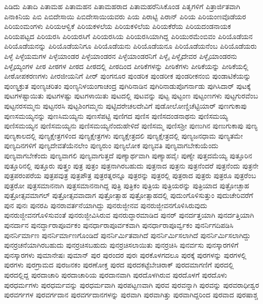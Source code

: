 {ಪಿಡಿದು
ಪಿತಾದಿ
ಪಿತಾಮಹ
ಪಿತಾಮಹನ
ಪಿತಾಮಹರಾದ
ಪಿತಾಮಹರೆನಿಸಿಕೊಂಡ
ಪಿತೃಗಳಿಗೆ
ಪಿತ್ರಾರ್ಜಿತವಾಗಿ
ಪಿನಾಕಿನಿಯ
ಪಿಬಿ
ಪಿಬಿದೇಸಾಯಿ
ಪಿಬಿದೇಸಾಯಿಯವರು
ಪಿಯ
ಪಿರಾಟ್ಟಿ
ಪಿರಾನ್
ಪಿರಿಯ
ಪಿರಿಯಂಣವೊಡೆಯರ
ಪಿರಿಯಂಮಂಗಳು
ಪಿರಿಯಆಳ್ವಿಕೆ
ಪಿರಿಯಕಳಲೆಯ
ಪಿರಿಯಕಳಿಲೆಯ
ಪಿರಿಯಕೆರೆಯ
ಪಿರಿಯದಂಡನಾಯಕ
ಪಿರಿಯಪಟ್ಟದ
ಪಿರಿಯರಸಿ
ಪಿರಿಯರಸಿಗೆ
ಪಿರಿಯರಸಿಯ
ಪಿರಿಯರಸಿಯಾಗಿದ್ದ
ಪಿರಿಯುರಮೆಂಬಿವಂ
ಪಿರಿಯೊಡೆಯನ
ಪಿರಿಯೊಡೆಯನನ್ನು
ಪಿರಿಯೊಡೆಯನಿಗೂ
ಪಿರಿಯೊಡೆಯನು
ಪಿರಿಯೊಡೆಯನೂ
ಪಿರಿಯೊಡೆಯನೆಂಬ
ಪಿರಿಯೊಡೆಯರು
ಪಿಳ್ಳೆ
ಪಿಳ್ಳೆಯಮಗಳ
ಪಿಳ್ಳೆಯಾಂಡರ
ಪಿಳ್ಳೆಯಾಂಡರನ
ಪಿಳ್ಳೆಯಾಂಡರನಿಗೆ
ಪಿಳ್ಳೈ
ಪಿಳ್ಳೈದೇವರ
ಪಿಳ್ಳೈಯಾಂಡರನು
ಪಿಳ್ಳೈಯ್ಯಂಗಳ
ಪೀಠ
ಪೀಠಗಳ
ಪೀಠದ
ಪೀಠದಲ್ಲಿ
ಪೀಠದಿಂದ
ಪೀಠಿಕೆಗಳನ್ನು
ಪೀಠಿಕೆಗಳು
ಪೀಠಿಕೆಯನ್ನು
ಪೀಠಿಕೆಯಲ್ಲಿ
ಪೀಠೋಪಕರಣಗಳು
ಪೀರಜೀಯನಿಗೆ
ಪೀರ್
ಪುಂಗನೂರ
ಪುಂಡರಿಕ
ಪುಂಡರೀಕ
ಪುಂಡರೀಕನಂಬಿ
ಪುಂಡಾಟಿಕೆಯನ್ನು
ಪುಂಣ್ಯಕ್ರುತ
ಪುಂಣ್ಯಚರಿತಂ
ಪುಂಣ್ಯನಿಳಯಂಗಾಚಂದ್ರ
ಪುಗಿರಿನಾಡಿನ
ಪುಗಿರಿನಾಡುಪೊಗರ್ನಾಡು
ಪುಗಿಸಿದಾರ್
ಪುಟಕ್ಕೆ
ಪುಟಗಳಷ್ಟಾಯಿತು
ಪುಟಗಳಷ್ಟು
ಪುಟಗಳಾಯಿತು
ಪುಟದಲ್ಲಿ
ಪುಟವನ್ನು
ಪುಟ್ಟ
ಪುಟ್ಟಂಣ
ಪುಟ್ಟಂಣಗಳು
ಪುಟ್ಟಗುರವೆಂಬ
ಪುಟ್ಟನರಸಮ್ಮನು
ಪುಟ್ಟನರಸಿ
ಪುಟ್ಟಶಿಂಗಮ್ಮನು
ಪುಟ್ಟಿದರೇಚಲದೇವಿಗೆ
ಪುಡೋಲೋಣ್ಡಿಚೆಟ್ಟಿಯಾರ್
ಪುಣಗುಕಾಪು
ಪುಣಸಮಯ್ಯನನ್ನು
ಪುಣಸಿಮಯ್ಯನು
ಪುಣಸೆಪಟ್ಟಿ
ಪುಣಿಗದ
ಪುಣಿಸ
ಪುಣಿಸದಂಡನಾಥನು
ಪುಣಿಸಮಯ್ಯ
ಪುಣಿಸಮಯ್ಯನ
ಪುಣಿಸಮಯ್ಯನು
ಪುಣಿಸಮಯ್ಯನೆಂದುಹೇಳಿದೆ
ಪುಣಿಸಮ್ಮ
ಪುಣಿಸಶ್ರೀ
ಪುಣುಗಿನ
ಪುಣುಗುಕಾಪು
ಪುಣ್ಯ
ಪುಣ್ಯಕಾಲದಲ್ಲಿ
ಪುಣ್ಯಕ್ಷೇತ್ರಗಳಿಂದ
ಪುಣ್ಯಕ್ಷೇತ್ರಗಳು
ಪುಣ್ಯಕ್ಷೇತ್ರದಲಿ
ಪುಣ್ಯಕ್ಷೇತ್ರದಲ್ಲಿ
ಪುಣ್ಯಜನಧಾಮ
ಪುಣ್ಯತಮೇ
ಪುಣ್ಯದಿನಗಳಿಗೆ
ಪುಣ್ಯದೇವತೆಯೆನಲೇಂ
ಪುಣ್ಯರುಂ
ಪುಣ್ಯಲೋಕ
ಪುಣ್ಯವತಿ
ಪುಣ್ಯವಾಗಬೇಕುಯೆಂದು
ಪುಣ್ಯವಾಗಬೇಕೆಂದು
ಪುಣ್ಯವಾಗಲಿ
ಪುಣ್ಯವಾಗುತ್ತದೆ
ಪುಣ್ಯಾರ್ಥವಾಗಿ
ಪುಣ್ಯಾಹವೈಃ
ಪುಣ್ಯೇ
ಪುತ್ತದಮೆಯ್ಯ
ಪುತ್ತೂರಿನ
ಪುತ್ತೂರಿನಲ್ಲಿ
ಪುತ್ತೂರು
ಪುತ್ತ್ರಂ
ಪುತ್ರ
ಪುತ್ರಂ
ಪುತ್ರನಾಗಿರಬಹುದು
ಪುತ್ರನಾದ
ಪುತ್ರನು
ಪುತ್ರನೆಂದರೆ
ಪುತ್ರನೆಂದು
ಪುತ್ರನೇ
ಪುತ್ರಪರಂಪರೆಯ
ಪುತ್ರಪವುತ್ರ
ಪುತ್ರಪೌತ್ರ
ಪುತ್ರರತ್ನರನ್ನೂ
ಪುತ್ರರನ್ನು
ಪುತ್ರರಲ್ಲಿ
ಪುತ್ರರಾದ
ಪುತ್ರರು
ಪುತ್ರರೂ
ಪುತ್ರರೆಂಬ
ಪುತ್ರರೋ
ಪುತ್ರಸಮಾನನಾಗಿ
ಪುತ್ರಸಮಾನನಾಗಿದ್ದ
ಪುತ್ರಿ
ಪುತ್ರಿಕಂ
ಪುತ್ರಿಯ
ಪುತ್ರಿಯರನ್ನು
ಪುತ್ರಿಯಾದ
ಪುತ್ರೋಚ್ಛಾಹ
ಪುತ್ರೋತ್ಸವಮಾಗಲ್
ಪುತ್ರೋತ್ಸವವಾದಾಗ
ಪುತ್ರೋತ್ಸಾಹ
ಪುತ್ರೋತ್ಸಾಹದಲ್ಲಿ
ಪುದುಂಗೊಳಿಸುತ್ತುಂ
ಪುದುಚೇರಿವರೆಗೆ
ಪುನ
ಪುನಃ
ಪುನರಪಿ
ಪುನರಾವರ್ತನೆಯಾಗಿದ್ದು
ಪುನರುಜ್ಜೀನವ
ಪುನರುಜ್ಜೀವನಗೊಳಿಸಿರುವುದು
ಪುನರುಜ್ಜೀವನಗೊಳಿಸುವಂತೆ
ಪುನರುಜ್ಜೀವಿಸಿರುವ
ಪುನರುದ್ಧಾರಮಾಡಿದ
ಪುನರ್
ಪುನರ್ದತ್ತಯಾಗಿ
ಪುನರ್ದತ್ತಿಯಾಗಿ
ಪುನರ್ದಾನ
ಪುನರ್ದ್ಧಾರಾಪೂರ್ವಕಂ
ಪುನರ್ಧಾರಾಪೂರ್ವಕವಾಗಿ
ಪುನರ್ಧಾರಾಪೂರ್ವ್ವಕಂ
ಪುನರ್ನಿಗದಿಪಡಿಸಿ
ಪುನರ್ನಿರ್ಮಾಣ
ಪುನರ್ನಿರ್ಮಾಣಗೊಂಡಿದೆ
ಪುನರ್ನಿರ್ಮಿತವಾಗಿದೆ
ಪುನರ್ನಿರ್ಮಿಸಲಾಗಿದೆ
ಪುನರ್ನಿರ್ಮಿಸಲಾಗಿದ್ದು
ಪುನರ್ರಚನೆಯಾಗಿರಬಹುದು
ಪುನರ್ರಚಿಸಬಹುದು
ಪುನರ್ರಚಿಸಲಾಯಿತು
ಪುನರ್ರಚಿಸಿ
ಪುನರ್ವಸು
ಪುನಸ್ಕಾರಗಳಿಗೆ
ಪುನಸ್ಕಾರಗಳು
ಪುಮಾನೇಷಃ
ಪುಮಾನ್
ಪುರ
ಪುರಂದರ
ಪುರಃ
ಪುರಕೊಳಗದಲೂ
ಪುರಕ್ಕೆ
ಪುರಗಳನ್ನು
ಪುರಗಳಲ್ಲಿ
ಪುರಗಳು
ಪುರಗ್ರಾಮದ
ಪುರಜನಕಂ
ಪುರಣೋಕ್ತ
ಪುರದ
ಪುರದಕಟ್ಟೆಬೇಚಿರಾಕ್
ಪುರದಮಾಗಣಿಗೆ
ಪುರದಲ್ಲಿ
ಪುರದಲ್ಲಿದ್ದ
ಪುರದಾಚಾರಿ
ಪುರದಾಚಾರಿಯ
ಪುರದಾನವಾಗಿ
ಪುರದೊಳಗಿರುವ
ಪುರದೊಳಗೆ
ಪುರದೊಳು
ಪುರಧರ್ಮಗಳು
ಪುರಧರ್ಮವನ್ನು
ಪುರಧರ್ಮವಾಗಿ
ಪುರಪಟ್ಟಣವಾಗಿ
ಪುರವ
ಪುರವನ್ನಾಗಿ
ಪುರವನ್ನು
ಪುರವರಾಧೀಶ್ವರ
ಪುರವರ್ಗಗಳ
ಪುರವರ್ಗದಾನ
ಪುರವರ್ಗದಾನಗಳನ್ನು
ಪುರವಾಗಿ
ಪುರವಾಗಿತ್ತು
ಪುರವಾಗಿದ್ದರಿಂದ
ಪುರವಾದ
ಪುರಷಾಶ್ಚ
}
